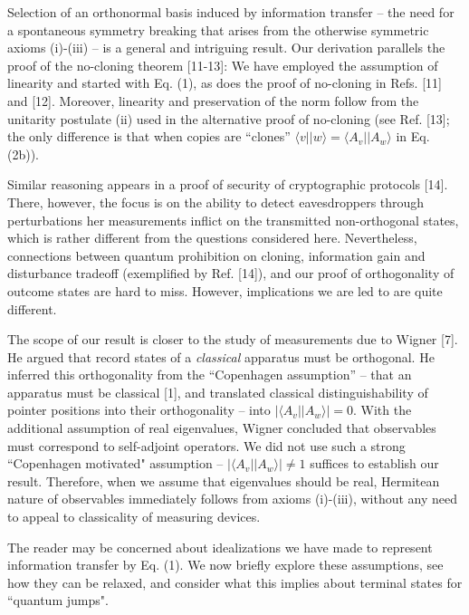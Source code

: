 \documentclass[aps,twocolumn,pra,onecolumn,12pt]{revtex4}
\newcommand{\bra}[1]    {\langle #1|}
\newcommand{\ket}[1]    {| #1 \rangle}
\newcommand{\+}         {\dagger}
\begin{document}
Selection of an orthonormal basis induced by information transfer -- the need for a spontaneous symmetry breaking that arises from the otherwise symmetric axioms (i)-(iii) -- is a general and intriguing result. Our derivation parallels the proof of the no-cloning theorem [11-13]: We have employed the assumption of linearity and started with Eq. (1), as does the proof of no-cloning in Refs. [11] and [12]. Moreover, linearity and preservation of the norm follow from the unitarity postulate (ii) used in the alternative proof of no-cloning (see Ref. [13]; the only difference is that when copies are ``clones''  $\bra {v} \ket {w}=\bra {A_v} \ket {A_w}$ in Eq. (2b)). 

Similar reasoning appears in a proof of security of cryptographic protocols [14]. There, however, the focus is on the ability to detect eavesdroppers through perturbations her measurements inflict on the transmitted non-orthogonal states, which is rather different from the questions considered here. 
Nevertheless, connections between quantum prohibition on cloning, information gain and disturbance 
tradeoff (exemplified by Ref. [14]),  and our proof of orthogonality of outcome states are
hard to miss. However, implications we are led to are quite different.

The scope of our result is closer to the study of measurements due to Wigner [7]. He argued 
that record states of a {\it classical} apparatus must be orthogonal. He inferred this orthogonality from 
the ``Copenhagen assumption'' -- that an apparatus must be classical [1], and translated classical 
distinguishability of pointer positions into their orthogonality -- into $|\bra {A_v}\ket{A_w}| =0$. 
With the additional assumption of real eigenvalues, Wigner concluded that observables must 
correspond to self-adjoint operators. We did not use such a strong ``Copenhagen motivated" 
assumption -- $|\bra {A_v}\ket{A_w}| \neq 1 $ suffices to establish our result. Therefore, when we 
assume that eigenvalues should be real, Hermitean nature of observables immediately follows from 
axioms (i)-(iii), without any need to appeal to classicality of measuring devices.

The reader may be concerned about idealizations we have made to represent information transfer by 
Eq. (1). We now briefly explore these assumptions, see how they can be relaxed, and consider 
what this implies about terminal states for ``quantum jumps".
\end{document}
